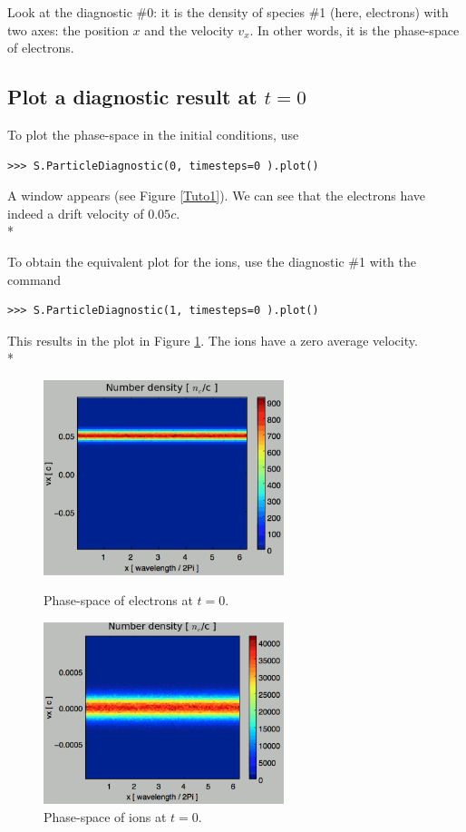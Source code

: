 \documentclass[11pt]{article}
\begin{document}
Look at the diagnostic \#0: it is the density of species \#1 (here, electrons) with two
axes: the position $x$ and the velocity $v_x$. In other words, it is the phase-space of electrons.

\subsection{Plot a diagnostic result at $t=0$}
To plot the phase-space in the initial conditions, use 
\begin{lstlisting}
>>> S.ParticleDiagnostic(0, timesteps=0 ).plot()
\end{lstlisting}
A window appears (see Figure \ref{Tuto1}). We can see that the electrons have indeed a drift velocity of $0.05c$.\\*

To obtain the equivalent plot for the ions, use the diagnostic \#1 with the command
\begin{lstlisting}
>>> S.ParticleDiagnostic(1, timesteps=0 ).plot()
\end{lstlisting}
This results in the plot in Figure \ref{Tuto2}. The ions have a zero average velocity.\\*

\begin{figure}[htbp]
\centering
\begin{minipage}[b]{.46\linewidth}
\includegraphics[width=7cm]{ParticleDiagTutorial1.png}
\caption{Phase-space of electrons at $t=0$.}
\label{Tuto1}
\end{minipage}
\hfill{}
\begin{minipage}[b]{.46\linewidth}
\includegraphics[width=7cm]{ParticleDiagTutorial2}
\caption{Phase-space of ions at $t=0$.}
\label{Tuto2}
\end{minipage}
\end{figure}
\end{document}
